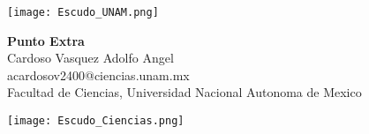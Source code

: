 \documentclass[11pt]{article}
\numberwithin{equation}{section}
\begin{document}
	\makeatletter
        \renewenvironment{proof}[1][\proofname]{\par
            \pushQED{\qed}%
            \normalfont \topsep6\p@\@plus6\p@\relax
            \trivlist
            \item\relax
            {\itshape
            #1\@addpunct{.}}\par\vspace{\baselineskip}\ignorespaces
            }{%
            \popQED\endtrivlist\@endpefalse
            }
    \makeatother

\begin{minipage}{3cm}
        \centering
        \texttt{[image: Escudo\_UNAM.png]}
    \end{minipage}\hfill
    \begin{minipage}{0.6\textwidth}
        \centering
        {\LARGE \textbf{Punto Extra}}\\[10pt]
        {Cardoso Vasquez Adolfo Angel}\\
        {acardosov2400@ciencias.unam.mx}\\[10pt]
        {Facultad de Ciencias, Universidad Nacional Autonoma de Mexico}\\
    \end{minipage}\hfill
    \begin{minipage}{3cm}
        \centering
        \texttt{[image: Escudo\_Ciencias.png]}
\end{minipage}\\[10pt]
\end{document}
